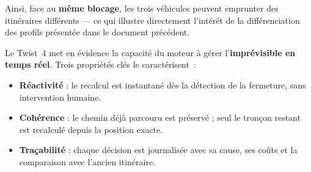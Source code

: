 \documentclass[12pt,a4paper]{article}
\begin{document}
\medskip
\noindent
Ainsi, face au \textbf{m\^eme blocage}, les trois v\'ehicules peuvent
emprunter des itin\'eraires diff\'erents --- ce qui illustre directement
l'int\'er\^et de la diff\'erenciation des profils pr\'esent\'ee dans
le document pr\'ec\'edent.

\bigskip

\begin{tcolorbox}[colback=grisléger, colframe=theorie, fonttitle=\bfseries,
  title={En r\'esum\'e}, sharp corners=south]
Le Twist~4 met en \'evidence la capacit\'e du moteur \`a g\'erer
l'\textbf{impr\'evisible en temps r\'eel}.
Trois propri\'et\'es cl\'es le caract\'erisent~:
\begin{itemize}[leftmargin=1.5em, itemsep=3pt]
  \item \textbf{R\'eactivit\'e} : le recalcul est instantan\'e d\`es la d\'etection
        de la fermeture, sans intervention humaine.
  \item \textbf{Coh\'erence} : le chemin d\'ej\`a parcouru est pr\'eserv\'e ;
        seul le tron\c{c}on restant est recalcul\'e depuis la position exacte.
  \item \textbf{Tra\c{c}abilit\'e} : chaque d\'ecision est journalis\'ee avec
        sa cause, ses co\^uts et la comparaison avec l'ancien itin\'eraire.
\end{itemize}
\end{tcolorbox}
\end{document}
